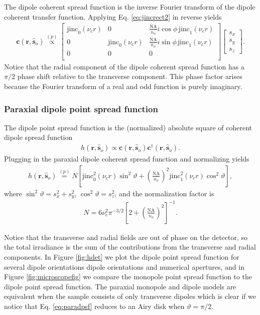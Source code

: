 \documentclass[]{osa-article}
\providecommand{\mb}[1]{\mathbf{#1}}
\providecommand{\so}{\mathbf{\hat{s}}_o}
\begin{document}
 The dipole coherent spread function is the inverse Fourier transform of the
 dipole coherent transfer function. Applying Eq. \ref{eq:jincrect2} in reverse
 yields
  \begin{align}
   \mb{c}(\mb{r}, \so) \stackrel{(p)}{\propto}
   \begin{bmatrix}
     \text{jinc}_0(\nu_c r)&0&\frac{\text{NA}}{n_o}i\cos\phi\,\text{jinc}_1(\nu_c r)\\
     0&\text{jinc}_0(\nu_c r)&\frac{\text{NA}}{n_o}i\sin\phi\,\text{jinc}_1(\nu_c r)\\
     0&0&0\\     
   \end{bmatrix}
   \begin{bmatrix}
     s_x\\
     s_y\\
     s_z
   \end{bmatrix}.
  \end{align}
  Notice that the radial component of the dipole coherent spread function has a
  $\pi/2$ phase shift relative to the transverse component. This phase factor
  arises because the Fourier transform of a real and odd function is purely
  imaginary.
  
  \subsubsection{Paraxial dipole point spread function}
  The dipole point spread function is the (normalized) absolute square of
coherent dipole spread function
\begin{align}
  h(\mb{r}, \so) \propto \mb{c}(\mb{r}, \so)\mb{c}^\dagger(\mb{r}, \so). 
\end{align}
Plugging in the paraxial dipole coherent spread function and normalizing yields
\begin{align}
  h(\mb{r}, \so) \stackrel{(p)}{=} N\left[\text{jinc}_0^2(\nu_c r)\sin^2\vartheta + \left(\frac{\text{NA}}{n_o}\right)^2\text{jinc}_1^2(\nu_c r)\cos^2\vartheta\right],\label{eq:paradpsf}
\end{align}
where $\sin^2\vartheta = s_x^2 + s_y^2$, $\cos^2\vartheta = s_z^2$, and the normalization factor is
\begin{align}
  N = 6\nu_c^2\pi^{-3/2}\left[2 + \left(\frac{\text{NA}}{n_o}\right)^2\right]^{-1}.
\end{align}

 Notice that the transverse and radial fields are out of phase on the detector,
 so the total irradiance is the sum of the contributions from the transverse and
 radial components. In Figure \ref{fig:hdet} we plot the dipole point spread
 function for several dipole orientations dipole orientations and numerical
 apertures, and in Figure \ref{fig:microscopefig} we compare the monopole point
 spread function to the dipole point spread function. The paraxial monopole and
 dipole models are equivalent when the sample consists of only transverse
 dipoles which is clear if we notice that Eq. \ref{eq:paradpsf} reduces to an
 Airy disk when $\vartheta = \pi/2$.
\end{document}
